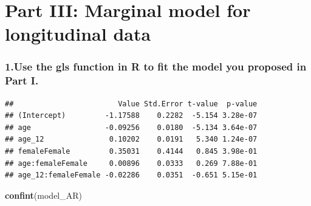 \documentclass[
]{article}
\newenvironment{Shaded}{\begin{snugshade}}{\end{snugshade}}
\newcommand{\AttributeTok}[1]{\textcolor[rgb]{0.13,0.29,0.53}{#1}}
\newcommand{\CommentTok}[1]{\textcolor[rgb]{0.56,0.35,0.01}{\textit{#1}}}
\newcommand{\FunctionTok}[1]{\textcolor[rgb]{0.13,0.29,0.53}{\textbf{#1}}}
\newcommand{\NormalTok}[1]{#1}
\newcommand{\OtherTok}[1]{\textcolor[rgb]{0.56,0.35,0.01}{#1}}
\newcommand{\SpecialCharTok}[1]{\textcolor[rgb]{0.81,0.36,0.00}{\textbf{#1}}}
\begin{document}
\hypertarget{part-iii-marginal-model-for-longitudinal-data}{%
\section{Part III: Marginal model for longitudinal
data}\label{part-iii-marginal-model-for-longitudinal-data}}

\hypertarget{use-the-gls-function-in-r-to-fit-the-model-you-proposed-in-part-i.}{%
\subsubsection{1.Use the gls function in R to fit the model you proposed
in Part
I.}\label{use-the-gls-function-in-r-to-fit-the-model-you-proposed-in-part-i.}}

\begin{Shaded}
\end{Shaded}

\begin{verbatim}
##                        Value Std.Error t-value  p-value
## (Intercept)         -1.17588    0.2282  -5.154 3.28e-07
## age                 -0.09256    0.0180  -5.134 3.64e-07
## age_12               0.10202    0.0191   5.340 1.24e-07
## femaleFemale         0.35031    0.4144   0.845 3.98e-01
## age:femaleFemale     0.00896    0.0333   0.269 7.88e-01
## age_12:femaleFemale -0.02286    0.0351  -0.651 5.15e-01
\end{verbatim}

\begin{Shaded}
\begin{Highlighting}[]
\FunctionTok{confint}\NormalTok{(model\_AR)}
\end{Highlighting}
\end{Shaded}
\end{document}
